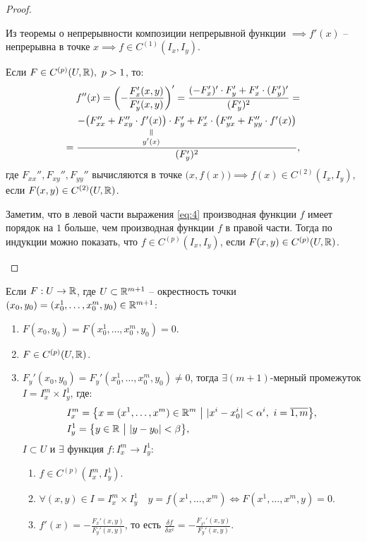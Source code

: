 \begin{proof}
\begin{enumerate}
              Из теоремы о непрерывности композиции непрерывной функции $\implies f'(x)$ -- непрерывна в точке $x \implies f \in C^{(1)}(I_x,I_y)$.

              Если $F \in C^{(p)}(U,\mathbb{R}), \ p > 1$, то:
              \begin{multline}\label{eq:4}
                  \quad f''(x) = \left(-\frac{F_x'(x,y)}{F_y'(x,y)}\right)' = \frac{(-F_x')' \cdot F_y' + F_x' \cdot (F_y')'}{(F_y')^2} = \\
                  = \frac{-\big(F_{xx}'' + F_{xy}'' \cdot \equalto{f'(x)}{y'(x)}\big)\cdot F_y' + F_x'\cdot \big(F_{yx}'' + F_{yy}'' \cdot f'(x)\big)}{(F_y')^2},
              \end{multline}
              где $F_{xx}'', F_{xy}'', F_{yy}''$ вычисляются в точке $\big(x,f(x)\big)\implies f(x) \in C^{(2)}(I_x,I_y)$, если $F(x,y) \in C^{(2)}(U,\mathbb{R})$.

              Заметим, что в левой части выражения \ref{eq:4} производная функции $f$ имеет порядок на $1$ больше, чем производная функции $f$ в правой части. Тогда по индукции можно показать, что $f \in C^{(p)}(I_x,I_y)$, если $F(x,y) \in C^{(p)}(U,\mathbb{R})$.
    \end{enumerate}
\end{proof}

\begin{theorem}[О неявной функции вида $F(x^1,\ldots,x^m,y) = 0$]
    Если $F:U \rightarrow \mathbb{R}$, где $U \subset \mathbb{R}^{m+1}$ -- окрестность точки $(x_0,y_0) = (x_0^1, \ldots, x_0^m,y_0) \in \mathbb{R}^{m+1}$:
    \begin{enumerate}
        \item $F(x_0,y_0) = F(x_0^1,\ldots,x_0^m,y_0) = 0$.
        \item $F \in C^{(p)}(U,\mathbb{R})$.
        \item $F_y'(x_0,y_0) = F_y'(x_0^1,\ldots,x_0^m,y_0) \ne 0$, тогда $\exists (m+1)$-мерный промежуток $I = I_x^m \times I_y^1$, где:
              \begin{align*}
                   & I_x^m = \big\{x = (x^1,\ldots,x^m) \in \R^m \ \big| \ |x^i - x_0^i| < \alpha^i, \ i = \overline{1,m}\big\}, \\
                   & I_y^1 = \big\{y \in \R \ \big| \ |y - y_0| < \beta\big\},
              \end{align*}
              $I \subset U$ и $\exists$ функция $f:I_x^m \rightarrow I_y^1:$
              \begin{enumerate}
                  \item $f \in C^{(p)}(I_x^m, I_y^1)$.
                  \item $\forall (x,y) \in I = I_x^m \times I_y^1 \quad y = f(x^1,\ldots,x^m) \iff F(x^1,\ldots,x^m,y) = 0$.
                  \item $f'(x) = -\frac{F_x'(x,y)}{F_y'(x,y)}$, то есть $\frac{\delta f}{\delta x^i} = -\frac{F_{x^i}'(x,y)}{F_y'(x,y)}$.
              \end{enumerate}
    \end{enumerate}
\end{theorem}

